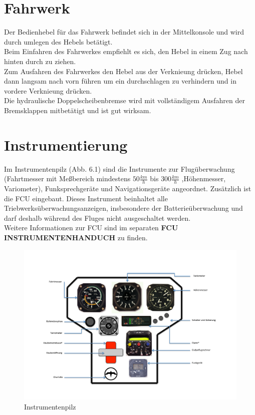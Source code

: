 \section{Fahrwerk}
Der Bedienhebel für das Fahrwerk befindet sich in der Mittelkonsole und wird durch umlegen des Hebels betätigt.\\
Beim Einfahren des Fahrwerkes empfiehlt es sich, den Hebel in einem Zug nach hinten durch zu ziehen.\\
Zum Ausfahren des Fahrwerkes den Hebel aus der Verknieung drücken, Hebel dann langsam nach vorn führen um ein durchschlagen zu verhindern und in vordere Verknieung drücken.\\
Die hydraulische Doppelscheibenbremse wird mit vollständigem Ausfahren der Bremsklappen mitbetätigt und ist gut wirksam.


\section{Instrumentierung}
Im Instrumentenpilz (Abb. 6.1) sind die Instrumente zur Flugüberwachung (Fahrtmesser mit Meßbereich mindestens $50 \frac{km}{h}$ bis $300 \frac{km}{h}$ ,Höhenmesser, Variometer), Funksprechgeräte und Navigationsgeräte angeordnet.
Zusätzlich ist die FCU eingebaut. Dieses Instrument beinhaltet alle Triebwerksüberwachungsanzeigen, insbesondere der Batterieüberwachung und darf deshalb während des Fluges nicht ausgeschaltet werden.\\

Weitere Informationen zur FCU sind im separaten \textbf{FCU INSTRUMENTENHANDUCH} zu finden.\\

\begin{figure}[ht]
\includegraphics[angle=90,width=\textwidth]{bilder/instrumentenpilz.pdf}
\caption{Instrumentenpilz}
\end{figure}

